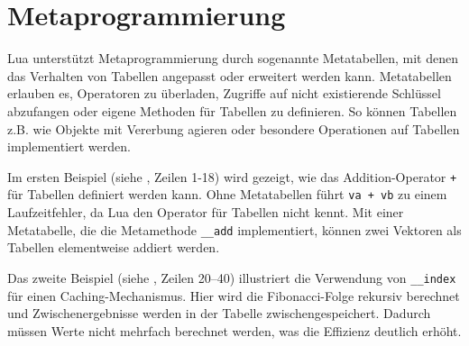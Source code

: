 \documentclass[11pt,a4paper]{article}
\begin{document}
\section*{Metaprogrammierung}

Lua unterstützt Metaprogrammierung durch sogenannte Metatabellen, mit denen das Verhalten von Tabellen angepasst oder erweitert werden kann.
Metatabellen erlauben es, Operatoren zu überladen, Zugriffe auf nicht existierende Schlüssel abzufangen oder eigene Methoden für Tabellen zu definieren.
So können Tabellen z.B. wie Objekte mit Vererbung agieren oder besondere Operationen auf Tabellen implementiert werden.

Im ersten Beispiel (siehe , Zeilen 1-18) wird gezeigt, wie das Addition-Operator \lstinline|+| für Tabellen definiert werden kann. 
Ohne Metatabellen führt \lstinline|va + vb| zu einem Laufzeitfehler, da Lua den Operator für Tabellen nicht kennt. 
Mit einer Metatabelle, die die Metamethode \lstinline|__add| implementiert, können zwei Vektoren als Tabellen elementweise addiert werden.

Das zweite Beispiel (siehe , Zeilen 20–40) illustriert die Verwendung von \lstinline|__index| für einen Caching-Mechanismus. 
Hier wird die Fibonacci-Folge rekursiv berechnet und Zwischenergebnisse werden in der Tabelle zwischengespeichert. 
Dadurch müssen Werte nicht mehrfach berechnet werden, was die Effizienz deutlich erhöht.
\end{document}
